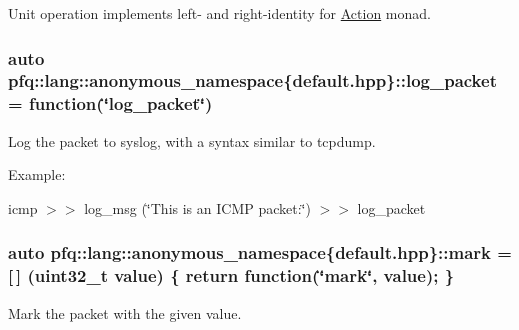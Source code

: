 Unit operation implements left-\/ and right-\/identity for \hyperlink{structpfq_1_1lang_1_1Action}{Action} monad. 

\subsubsection[{\texorpdfstring{log\+\_\+packet}{log_packet}}]{\setlength{\rightskip}{0pt plus 5cm}auto pfq\+::lang\+::anonymous\+\_\+namespace\{default.\+hpp\}\+::log\+\_\+packet = {\bf function}(\char`\"{}log\+\_\+packet\char`\"{})}\hypertarget{namespacepfq_1_1lang_1_1anonymous__namespace_02default_8hpp_03_aed6076a98aece625738cbda3689183e2}{}\label{namespacepfq_1_1lang_1_1anonymous__namespace_02default_8hpp_03_aed6076a98aece625738cbda3689183e2}


Log the packet to syslog, with a syntax similar to tcpdump. 

Example\+:

icmp $>$$>$ log\+\_\+msg (\char`\"{}\+This is an I\+C\+M\+P packet\+:\char`\"{}) $>$$>$ log\+\_\+packet 
\subsubsection[{\texorpdfstring{mark}{mark}}]{\setlength{\rightskip}{0pt plus 5cm}auto pfq\+::lang\+::anonymous\+\_\+namespace\{default.\+hpp\}\+::mark = \mbox{[}$\,$\mbox{]} (uint32\+\_\+t value) \{ return {\bf function}(\char`\"{}mark\char`\"{}, value); \}}\hypertarget{namespacepfq_1_1lang_1_1anonymous__namespace_02default_8hpp_03_a7b831baeabda070b89ca862a9445a4a8}{}\label{namespacepfq_1_1lang_1_1anonymous__namespace_02default_8hpp_03_a7b831baeabda070b89ca862a9445a4a8}


Mark the packet with the given value. 

